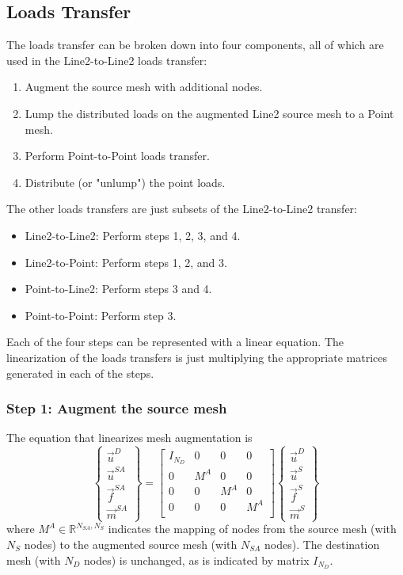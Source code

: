 \documentclass[10pt,letterpaper,oneside,notitlepage]{article}
\begin{document}
\subsection{Loads Transfer}
The loads transfer can be broken down into four components, all of which are used in the Line2-to-Line2 loads transfer:
\begin{enumerate}
  \item Augment the source mesh with additional nodes.
  \item Lump the distributed loads on the augmented Line2 source mesh to a Point mesh.
  \item Perform Point-to-Point loads transfer.
  \item Distribute (or "unlump") the point loads.	
\end{enumerate}
The other loads transfers are just subsets of the Line2-to-Line2 transfer:
\begin{itemize}
  \item Line2-to-Line2: Perform steps 1, 2, 3, and 4.
  \item Line2-to-Point: Perform steps 1, 2, and 3.
  \item Point-to-Line2: Perform steps 3 and 4.
  \item Point-to-Point: Perform step 3.
\end{itemize}


Each of the four steps can be represented with a linear equation. The linearization of the loads transfers is just multiplying the 
appropriate matrices generated in each of the steps.


\subsubsection{Step 1: Augment the source mesh}
The equation that linearizes mesh augmentation is
\begin{equation}
\label{Augment}
	\left\{	\begin{matrix} \vec{u}^D \\ \vec{u}^{SA} \\ \vec{f}^{SA} \\ \vec{m}^{SA} \end{matrix} \right\} 
=
	\begin{bmatrix}
	I_{\mathit{N_D}} & 0   & 0   & 0   \\
	0 							 & M^A & 0   & 0   \\
	0 							 & 0   & M^A & 0   \\
	0								 & 0   & 0   & M^A \\
	\end{bmatrix}
	\left\{	\begin{matrix} \vec{u}^D \\ \vec{u}^S \\ \vec{f}^S \\ \vec{m}^S \end{matrix} \right\} 
\end{equation}
where $M^A \in \mathbb{R}^{ \mathit{N_{SA}},\mathit{N_{S}}}$ indicates the mapping of nodes from the source mesh (with $N_S$ nodes) to the augmented source mesh
(with $N_{SA}$ nodes). The destination mesh (with $N_D$ nodes) is unchanged, as is indicated by matrix $I_{\mathit{N_D}}$.
\end{document}
